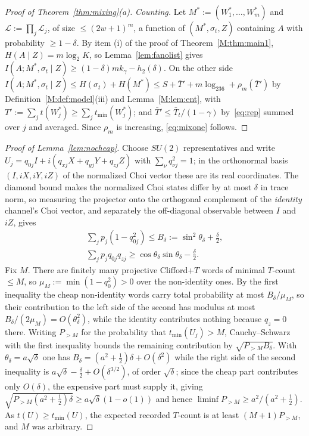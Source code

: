 \documentclass[aps,prx,twocolumn,superscriptaddress,nofootinbib,longbibliography]{revtex4-2}
\theoremstyle{plain}
\theoremstyle{definition}
\theoremstyle{remark}
\begin{document}
\begin{proof}[Proof of Theorem~\ref{thm:mixing}(a)]
\emph{Counting.} Let $M^*:=(W^*_1,\dots,W^*_m)$ and $\mathcal L:=\prod_j\mathcal L_j$, of size $\le(2w+1)^m$, a function of $(M^*,\sigma_t,Z)$ containing $A$ with probability $\ge1-\delta$. By item (i) of the proof of Theorem~\ref{M:thm:main1}, $H(A\mid Z)=m\log_2K$, so Lemma~\ref{lem:fanolist} gives $I(A;M^*,\sigma_t\mid Z)\ge(1-\delta)mk_\gamma-h_2(\delta)$. On the other side $I(A;M^*,\sigma_t\mid Z)\le H(\sigma_t)+H(M^*)\le S+\bar T'+m\log_236+\rho_m(\bar T')$ by Definition~\ref{M:def:model}(iii) and Lemma~\ref{M:lem:ent}, with $T':=\sum_jt(W^*_j)\ge\sum_jt_{\min}(W^*_j)$; and $\bar T'\le\bar T_t/(1-\gamma)$ by~\eqref{eq:rep} summed over $j$ and averaged. Since $\rho_m$ is increasing, \eqref{eq:mixone} follows.
\end{proof}

\begin{proof}[Proof of Lemma~\ref{lem:nocheap}]
Choose $SU(2)$ representatives and write $U_j=q_{0j}I+i(q_{xj}X+q_{yj}Y+q_{zj}Z)$ with $\sum_\nu q_{\nu j}^2=1$; in the orthonormal basis $(I,iX,iY,iZ)$ of the normalized Choi vector these are its real coordinates. The diamond bound makes the normalized Choi states differ by at most $\delta$ in trace norm, so measuring the projector onto the orthogonal complement of the \emph{identity} channel's Choi vector, and separately the off-diagonal observable between $I$ and $iZ$, gives
\[
\begin{gathered}
\sum_jp_j(1-q_{0j}^2)\le B_\delta:=\sin^2\theta_\delta+\tfrac\delta2,\\
\sum_jp_jq_{0j}q_{zj}\ge\cos\theta_\delta\sin\theta_\delta-\tfrac\delta2 .
\end{gathered}
\]
Fix $M$. There are finitely many projective Clifford+$T$ words of minimal $T$-count $\le M$, so $\mu_M:=\min(1-q_0^2)>0$ over the non-identity ones. By the first inequality the cheap non-identity words carry total probability at most $B_\delta/\mu_M$, so their contribution to the left side of the second has modulus at most $B_\delta/(2\mu_M)=O(\theta_\delta^2)$, while the identity contributes nothing because $q_z=0$ there. Writing $P_{>M}$ for the probability that $t_{\min}(U_j)>M$, Cauchy--Schwarz with the first inequality bounds the remaining contribution by $\sqrt{P_{>M}B_\delta}$. With $\theta_\delta=a\sqrt\delta$ one has $B_\delta=(a^2+\tfrac12)\delta+O(\delta^2)$ while the right side of the second inequality is $a\sqrt\delta-\tfrac\delta2+O(\delta^{3/2})$, of order $\sqrt\delta$; since the cheap part contributes only $O(\delta)$, the expensive part must supply it, giving $\sqrt{P_{>M}(a^2+\tfrac12)\delta}\ge a\sqrt\delta(1-o(1))$ and hence $\liminf P_{>M}\ge a^2/(a^2+\tfrac12)$. As $t(U)\ge t_{\min}(U)$, the expected recorded $T$-count is at least $(M+1)P_{>M}$, and $M$ was arbitrary.
\end{proof}
\end{document}
